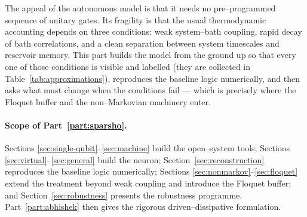 \documentclass[11pt,a4paper]{article}
\theoremstyle{plain}
\theoremstyle{definition}
\theoremstyle{remark}
\begin{document}
The appeal of the autonomous model is that it needs no pre--programmed
sequence of unitary gates. Its fragility is that the usual thermodynamic
accounting depends on three conditions: weak system--bath coupling, rapid
decay of bath correlations, and a clean separation between system
timescales and reservoir memory. This part builds the model from the
ground up so that every one of those conditions is visible and labelled
(they are collected in Table~\ref{tab:approximations}), reproduces the
baseline logic numerically, and then asks what must change when the
conditions fail --- which is precisely where the Floquet buffer and the
non--Markovian machinery enter.

\paragraph{Scope of Part~\ref{part:sparsho}.} Sections
\ref{sec:single-qubit}--\ref{sec:machine} build the open--system tools;
Sections \ref{sec:virtual}--\ref{sec:general} build the neuron;
Section~\ref{sec:reconstruction} reproduces the baseline logic
numerically; Sections \ref{sec:nonmarkov}--\ref{sec:floquet} extend the
treatment beyond weak coupling and introduce the Floquet buffer; and
Section~\ref{sec:robustness} presents the robustness programme.
Part~\ref{part:abhishek} then gives the rigorous driven--dissipative
formulation.
\end{document}
